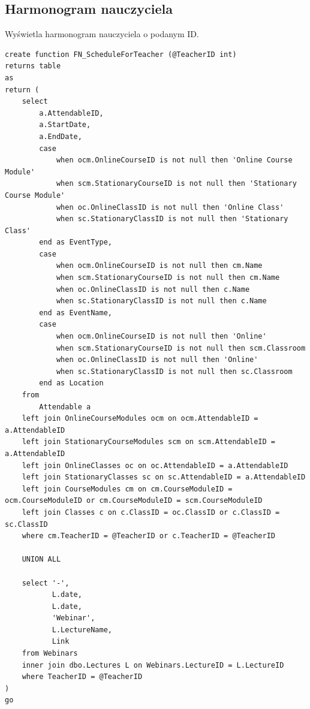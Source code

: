 \documentclass[11pt,a4paper]{article}
\begin{document}
\subsection{Harmonogram nauczyciela}
Wyświetla harmonogram nauczyciela o podanym ID.
\begin{Verbatim}[breaklines=true]
create function FN_ScheduleForTeacher (@TeacherID int)
returns table
as
return (
    select
        a.AttendableID,
        a.StartDate,
        a.EndDate,
        case
            when ocm.OnlineCourseID is not null then 'Online Course Module'
            when scm.StationaryCourseID is not null then 'Stationary Course Module'
            when oc.OnlineClassID is not null then 'Online Class'
            when sc.StationaryClassID is not null then 'Stationary Class'
        end as EventType,
        case
            when ocm.OnlineCourseID is not null then cm.Name
            when scm.StationaryCourseID is not null then cm.Name
            when oc.OnlineClassID is not null then c.Name
            when sc.StationaryClassID is not null then c.Name
        end as EventName,
        case
            when ocm.OnlineCourseID is not null then 'Online'
            when scm.StationaryCourseID is not null then scm.Classroom
            when oc.OnlineClassID is not null then 'Online'
            when sc.StationaryClassID is not null then sc.Classroom
        end as Location
    from
        Attendable a
    left join OnlineCourseModules ocm on ocm.AttendableID = a.AttendableID
    left join StationaryCourseModules scm on scm.AttendableID = a.AttendableID
    left join OnlineClasses oc on oc.AttendableID = a.AttendableID
    left join StationaryClasses sc on sc.AttendableID = a.AttendableID
    left join CourseModules cm on cm.CourseModuleID = ocm.CourseModuleID or cm.CourseModuleID = scm.CourseModuleID
    left join Classes c on c.ClassID = oc.ClassID or c.ClassID = sc.ClassID
    where cm.TeacherID = @TeacherID or c.TeacherID = @TeacherID

    UNION ALL

    select '-',
           L.date,
           L.date,
           'Webinar',
           L.LectureName,
           Link
    from Webinars
    inner join dbo.Lectures L on Webinars.LectureID = L.LectureID
    where TeacherID = @TeacherID
)
go
\end{Verbatim}
\end{document}
